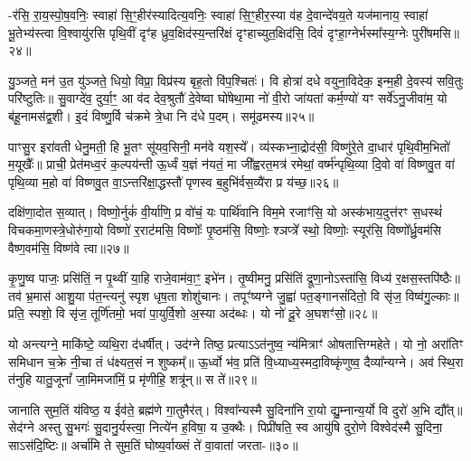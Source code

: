 -र॑सि॒ रा॒य॒स्पो॒ष॒वनिः॒ स्वाहा॑ सि॒ꣳ॒हीर॑स्यादित्य॒वनिः॒ स्वाहा॑ सि॒ꣳ॒हीर॒स्या व॑ह दे॒वान्दे॑वय॒ते यज॑मानाय॒ स्वाहा॑ भू॒तेभ्य॑स्त्वा वि॒श्वायु॑रसि पृथि॒वीं दृꣳ॑ह ध्रुव॒क्षिद॑स्य॒न्तरि॑क्षं दृꣳहाच्युत॒क्षिद॑सि॒ दिवं॑ दृꣳहा॒ग्नेर्भस्मा᳚स्य॒ग्नेः पुरी॑षमसि॥२४॥

{\anuvakamend[{नाम॑ सुप्रजा॒वनिः॒ स्वाहा॑ सि॒ꣳ॒हीः पञ्च॑त्रिꣳशच्च॥12॥}]}

यु॒ञ्जते॒ मन॑ उ॒त यु॑ञ्जते॒ धियो॒ विप्रा॒ विप्र॑स्य बृह॒तो वि॑प॒श्चितः॑। वि होत्रा॑ दधे वयुना॒विदेक॒ इन्म॒ही दे॒वस्य॑ सवि॒तुः परि॑ष्टुतिः॥ सु॒वाग्दे॑व॒ दुर्या॒ꣳ॒ आ व॑द देव॒श्रुतौ॑ दे॒वेष्वा घो॑षेथा॒मा नो॑ वी॒रो जा॑यतां कर्म॒ण्यो॑ यꣳ सर्वे॑\-ऽनु॒जीवा॑म॒ यो ब॑हू॒नामस॑द्व॒शी। इ॒दं विष्णु॒र्वि च॑क्रमे त्रे॒धा नि द॑धे प॒दम्। समू॑ढमस्य॥२५॥

पाꣳसु॒र इरा॑वती धेनु॒मती॒ हि भू॒तꣳ सू॑यव॒सिनी॒ मन॑वे यश॒स्ये᳚। व्य॑स्कभ्ना॒द्रोद॑सी॒ विष्णु॑रे॒ते दा॒धार॑ पृथि॒वीम॒भितो॑ म॒यूखैः᳚॥ प्राची॒ प्रेत॑मध्व॒रं क॒ल्पय॑न्ती ऊ॒र्ध्वं य॒ज्ञं न॑यतं॒ मा जी᳚ह्वरत॒मत्र॑ रमेथां॒ वर्ष्म॑न्पृथि॒व्या दि॒वो वा॑ विष्णवु॒त वा॑ पृथि॒व्या म॒हो वा॑ विष्णवु॒त वा॒\-ऽन्तरि॑क्षा॒द्धस्तौ॑ पृणस्व ब॒हुभि॑र्वस॒व्यै॑रा प्र य॑च्छ॒॥२६॥

दक्षि॑णा॒दोत स॒व्यात्। विष्णो॒र्नुकं॑ वी॒र्या॑णि॒ प्र वो॑चं॒ यः पार्थि॑वानि विम॒मे रजाꣳ॑सि॒ यो अस्क॑भाय॒दुत्त॑रꣳ स॒धस्थं॑ विचकमा॒णस्त्रे॒धोरु॑गा॒यो विष्णो॑ र॒राट॑मसि॒ विष्णोः᳚ पृ॒ष्ठम॑सि॒ विष्णोः॒ श्ञप्त्रे᳚ स्थो॒ विष्णोः॒ स्यूर॑सि॒ विष्णो᳚र्ध्रु॒वम॑सि वैष्ण॒वम॑सि॒ विष्ण॑वे त्वा॥२७॥

{\anuvakamend[{अ॒स्य॒ य॒च्छैका॒न्नच॑त्वारि॒ꣳ॒शच्च॑॥13॥}]}

कृ॒णु॒ष्व पाजः॒ प्रसि॑तिं॒ न पृ॒थ्वीं या॒हि राजे॒वाम॑वा॒ꣳ॒ इभे॑न। तृ॒ष्वीमनु॒ प्रसि॑तिं द्रूणा॒नो\-ऽस्ता॑सि॒ विध्य॑ र॒क्षस॒स्तपि॑ष्ठैः॥ तव॑ भ्र॒मास॑ आशु॒या प॑त॒न्त्यनु॑ स्पृश धृष॒ता शोशु॑चानः। तपूꣳ॑ष्यग्ने जु॒ह्वा॑ पत॒ङ्गानसं॑दितो॒ वि सृ॑ज॒ विष्व॑गु॒ल्काः॥ प्रति॒ स्पशो॒ वि सृ॑ज॒ तूर्णि॑तमो॒ भवा॑ पा॒युर्वि॒शो अ॒स्या अद॑ब्धः। यो नो॑ दू॒रे अ॒घशꣳ॑सो॒॥२८॥

यो अन्त्यग्ने॒ माकि॑ष्टे॒ व्यथि॒रा द॑धर्षीत्। उद॑ग्ने तिष्ठ॒ प्रत्या\-ऽ\-ऽत॑नुष्व॒ न्य॑मित्राꣳ॑ ओषतात्तिग्महेते। यो नो॒ अरा॑तिꣳ समिधान च॒क्रे नी॒चा तं ध॑क्ष्यत॒सं न शुष्कम्᳚॥ ऊ॒र्ध्वो भ॑व॒ प्रति॑ वि॒ध्याध्य॒स्मदा॒विष्कृ॑णुष्व॒ दैव्या᳚न्यग्ने। अव॑ स्थि॒रा त॑नुहि यातु॒जूनां᳚ जा॒मिमजा॑मिं॒ प्र मृ॑णीहि॒ शत्रू॑न्॥ स ते॑॥२९॥

जानाति सुम॒तिं य॑विष्ठ॒ य ईव॑ते॒ ब्रह्म॑णे गा॒तुमैर॑त्। विश्वा᳚न्यस्मै सु॒दिना॑नि रा॒यो द्यु॒म्नान्य॒र्यो वि दुरो॑ अ॒भि द्यौ᳚त्॥ सेद॑ग्ने अस्तु सु॒भगः॑ सु॒दानु॒र्यस्त्वा॒ नित्ये॑न ह॒विषा॒ य उ॒क्थैः। पिप्री॑षति॒ स्व आयु॑षि दुरो॒णे विश्वेद॑स्मै सु॒दिना॒ सा\-ऽस॑दि॒ष्टिः॥ अर्चा॑मि ते सुम॒तिं घोष्य॒र्वाख्सं ते॑ वा॒वाता॑ जरता-॥३०॥

